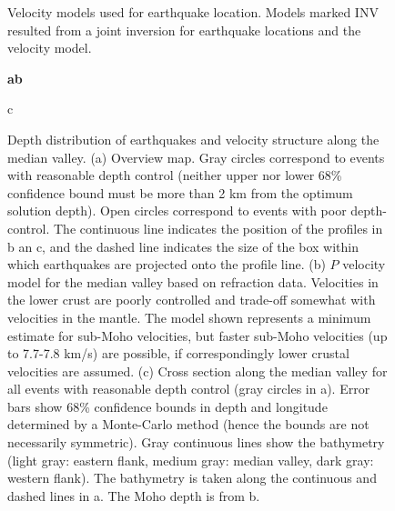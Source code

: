 \documentclass[jgr]{agu2001}
\begin{document}
\begin{figure}
\caption{Velocity models used for earthquake location.  Models marked INV resulted from a joint inversion for earthquake locations and the velocity model.}
\label{fig:velmod}
\end{figure}



\begin{figure}
\large \sf \bf a\hspace{14pc}b


\begin{flushleft}c\end{flushleft}


\caption{Depth distribution of earthquakes and velocity structure
along the median valley. 
(a) Overview map.  Gray  circles correspond to
events with reasonable depth control (neither upper nor lower 68\% confidence
bound must be more than 2 km from the optimum solution depth). Open circles correspond
to events with poor depth-control. The continuous line indicates the position
of the profiles in b an c, and the dashed line indicates the size of
the box within which earthquakes are projected onto the profile line.
 (b) $P$ velocity model for the median valley based on
refraction data. Velocities in the lower crust are poorly controlled
and trade-off somewhat with velocities in the mantle.  The model shown
represents a minimum estimate for
sub-Moho velocities, but faster sub-Moho velocities (up to 7.7-7.8
km/s) are possible, if correspondingly lower crustal velocities are
assumed.
(c) Cross section along the median valley for all events with
reasonable depth control (gray circles in a).  Error bars show
68\% confidence bounds in depth and longitude determined by a
Monte-Carlo method (hence the bounds are not necessarily symmetric). 
Gray continuous lines show the bathymetry (light gray: eastern flank,
medium gray: median valley, dark gray: western flank). The bathymetry
is taken along the continuous and dashed lines in a. The Moho depth is from b.}
\label{fig:croslon}
\end{figure}

\clearpage
\end{document}
